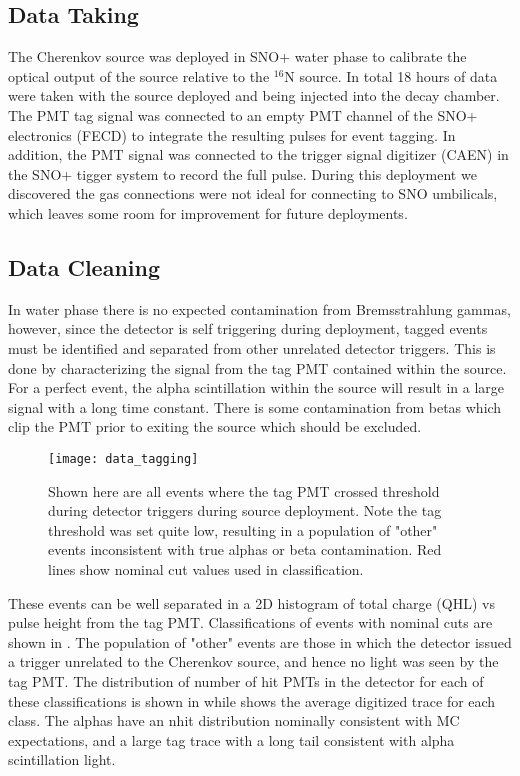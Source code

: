 \subsection{Data Taking}
The Cherenkov source was deployed in SNO+ water phase to calibrate the optical output of the source relative to the $^16$N source.
In total 18 hours of data were taken with the source deployed and \Li being injected into the decay chamber.
The PMT tag signal was connected to an empty PMT channel of the SNO+ electronics (FECD) to integrate the resulting pulses for event tagging.
In addition, the PMT signal was connected to the trigger signal digitizer (CAEN) in the SNO+ tigger system to record the full pulse.
During this deployment we discovered the gas connections were not ideal for connecting to SNO umbilicals, which leaves some room for improvement for future deployments.

\subsection{Data Cleaning}
In water phase there is no expected contamination from Bremsstrahlung gammas, however, since the detector is self triggering during deployment, tagged events must be identified and separated from other unrelated detector triggers.
This is done by characterizing the signal from the tag PMT contained within the source.
For a perfect event, the alpha scintillation within the source will result in a large signal with a long time constant.
There is some contamination from \Li betas which clip the PMT prior to exiting the source which should be excluded.


\begin{figure}
\centering
\texttt{[image: data\_tagging]}
\caption{\label{fig:chsrc_classify} Shown here are all events where the tag PMT crossed threshold during detector triggers during source deployment. Note the tag threshold was set quite low, resulting in a population of "other" events inconsistent with true alphas or beta contamination. Red lines show nominal cut values used in classification.}
\end{figure}

These events can be well separated in a 2D histogram of total charge (QHL) vs pulse height from the tag PMT. 
Classifications of events with nominal cuts are shown in .
The population of "other" events are those in which the detector issued a trigger unrelated to the Cherenkov source, and hence no light was seen by the tag PMT.
The distribution of number of hit PMTs in the detector for each of these classifications is shown in  while  shows the average digitized trace for each class.
The alphas have an nhit distribution nominally consistent with MC expectations, and a large tag trace with a long tail consistent with alpha scintillation light.


